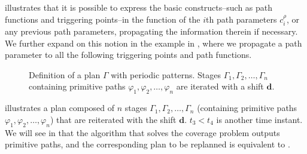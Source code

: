  illustrates that it is possible to express the basic constructs--such as path functions and triggering points--in the function of the $i$th path parameters $c_{i}^{\rho}$, or any previous path parameters, propagating the information therein if necessary. We further expand on this notion in the example in , where we propagate a path parameter to all the following triggering points and path functions.

\begin{figure}[h!]
  \center
  \caption[Definition of a plan with a loop]{Definition of a plan $\Gamma$ with periodic patterns. Stages $\Gamma_1,\Gamma_2,\dots,\Gamma_n$ containing primitive paths $\varphi_1,\varphi_2,\dots,\varphi_n$ are iterated with a shift $\mathbf{d}$.}
  \label{fig:state-machine-loop}
\end{figure}
 illustrates a plan composed of $n$ stages $\Gamma_1,\Gamma_2,\dots,\Gamma_n$ (containing primitive paths $\varphi_1,\varphi_2,\dots,\varphi_n$) that are reiterated with the shift $\mathbf{d}$. $t_3<t_4$ is another time instant. We will see in  that the algorithm that solves the coverage problem outputs primitive paths, and the corresponding plan to be replanned is equivalent to . 


